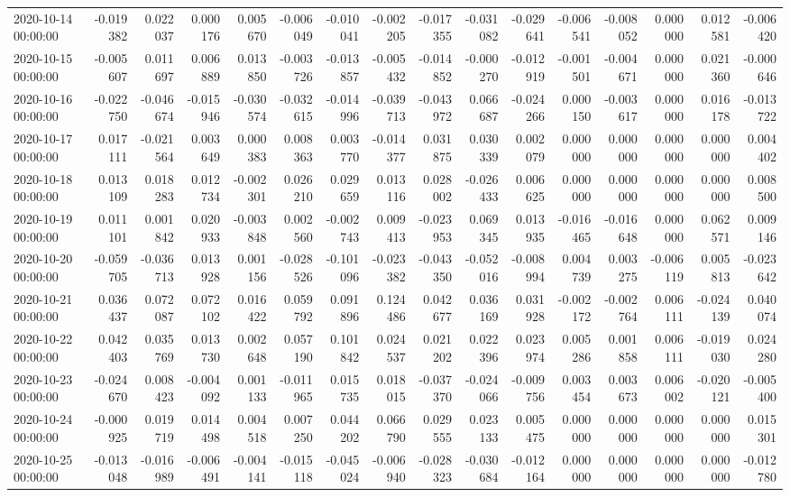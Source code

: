 \begin{tabular}{lrrrrrrrrrrrrrrr}
2020-10-14 00:00:00 & -0.019382 & 0.022037 & 0.000176 & 0.005670 & -0.006049 & -0.010041 & -0.002205 & -0.017355 & -0.031082 & -0.029641 & -0.006541 & -0.008052 & 0.000000 & 0.012581 & -0.006420 \\
2020-10-15 00:00:00 & -0.005607 & 0.011697 & 0.006889 & 0.013850 & -0.003726 & -0.013857 & -0.005432 & -0.014852 & -0.000270 & -0.012919 & -0.001501 & -0.004671 & 0.000000 & 0.021360 & -0.000646 \\
2020-10-16 00:00:00 & -0.022750 & -0.046674 & -0.015946 & -0.030574 & -0.032615 & -0.014996 & -0.039713 & -0.043972 & 0.066687 & -0.024266 & 0.000150 & -0.003617 & 0.000000 & 0.016178 & -0.013722 \\
2020-10-17 00:00:00 & 0.017111 & -0.021564 & 0.003649 & 0.000383 & 0.008363 & 0.003770 & -0.014377 & 0.031875 & 0.030339 & 0.002079 & 0.000000 & 0.000000 & 0.000000 & 0.000000 & 0.004402 \\
2020-10-18 00:00:00 & 0.013109 & 0.018283 & 0.012734 & -0.002301 & 0.026210 & 0.029659 & 0.013116 & 0.028002 & -0.026433 & 0.006625 & 0.000000 & 0.000000 & 0.000000 & 0.000000 & 0.008500 \\
2020-10-19 00:00:00 & 0.011101 & 0.001842 & 0.020933 & -0.003848 & 0.002560 & -0.002743 & 0.009413 & -0.023953 & 0.069345 & 0.013935 & -0.016465 & -0.016648 & 0.000000 & 0.062571 & 0.009146 \\
2020-10-20 00:00:00 & -0.059705 & -0.036713 & 0.013928 & 0.001156 & -0.028526 & -0.101096 & -0.023382 & -0.043350 & -0.052016 & -0.008994 & 0.004739 & 0.003275 & -0.006119 & 0.005813 & -0.023642 \\
2020-10-21 00:00:00 & 0.036437 & 0.072087 & 0.072102 & 0.016422 & 0.059792 & 0.091896 & 0.124486 & 0.042677 & 0.036169 & 0.031928 & -0.002172 & -0.002764 & 0.006111 & -0.024139 & 0.040074 \\
2020-10-22 00:00:00 & 0.042403 & 0.035769 & 0.013730 & 0.002648 & 0.057190 & 0.101842 & 0.024537 & 0.021202 & 0.022396 & 0.023974 & 0.005286 & 0.001858 & 0.006111 & -0.019030 & 0.024280 \\
2020-10-23 00:00:00 & -0.024670 & 0.008423 & -0.004092 & 0.001133 & -0.011965 & 0.015735 & 0.018015 & -0.037370 & -0.024066 & -0.009756 & 0.003454 & 0.003673 & 0.006002 & -0.020121 & -0.005400 \\
2020-10-24 00:00:00 & -0.000925 & 0.019719 & 0.014498 & 0.004518 & 0.007250 & 0.044202 & 0.066790 & 0.029555 & 0.023133 & 0.005475 & 0.000000 & 0.000000 & 0.000000 & 0.000000 & 0.015301 \\
2020-10-25 00:00:00 & -0.013048 & -0.016989 & -0.006491 & -0.004141 & -0.015118 & -0.045024 & -0.006940 & -0.028323 & -0.030684 & -0.012164 & 0.000000 & 0.000000 & 0.000000 & 0.000000 & -0.012780 \\

\end{tabular}
